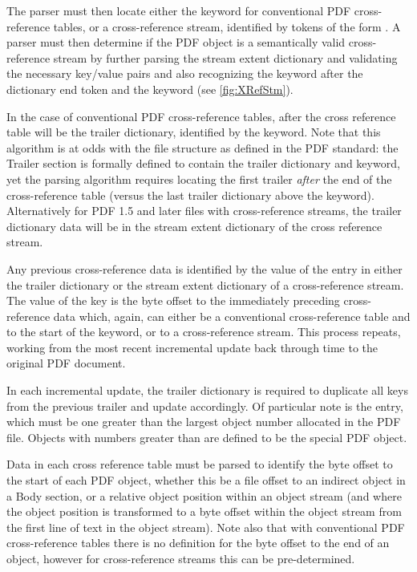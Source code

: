 The parser must then locate either the  keyword for
conventional PDF cross-reference tables, or a cross-reference stream, identified by tokens of the form  . 
A parser must then determine if the PDF object is a
semantically valid cross-reference stream by further parsing the stream extent dictionary and 
validating the necessary key/value pairs and also recognizing the  keyword after the dictionary end token \lstcd{>>} and the  keyword (see \cref{fig:XRefStm}). 

In the case of conventional PDF
cross-reference tables, after the cross reference table will be the
trailer dictionary, identified by the  keyword. 
Note that this algorithm is at
odds with the file structure as defined in the PDF standard: the Trailer section is formally defined
to contain the trailer dictionary and  keyword, yet the parsing algorithm
requires locating the first trailer \emph{after} the end of the cross-reference table 
(versus the last trailer dictionary above the  keyword). 
Alternatively for PDF 1.5 and later files with cross-reference
streams, the trailer dictionary data will be in the stream extent
dictionary of the cross reference stream. 

Any previous cross-reference data is identified by the value of the  entry in either
the trailer dictionary or the stream extent dictionary of a cross-reference stream. The
value of the  key is the byte offset to the immediately
preceding cross-reference data which, again, can either be a conventional
cross-reference table and to the start of the  keyword, or to a
cross-reference stream. This process repeats, working from the most recent incremental
update back through time to the original PDF document.

In each incremental update, the trailer dictionary is required to duplicate all keys from the previous
trailer and update accordingly. Of particular note is the  entry, which must be
one greater than the largest object number allocated in the PDF file. Objects with numbers greater
than  are defined to be the special PDF  object.

Data in each cross reference table must be parsed to
identify the byte offset to the start of each PDF object, whether this be a file offset to an 
indirect object in a Body section, or a relative object position within an object stream (and 
where the object position is transformed to a byte offset within the object stream from the 
first line of text in the object stream). Note also that with conventional PDF cross-reference 
tables there is no definition for the byte offset to the end of an object, however for cross-reference 
streams this can be pre-determined.

